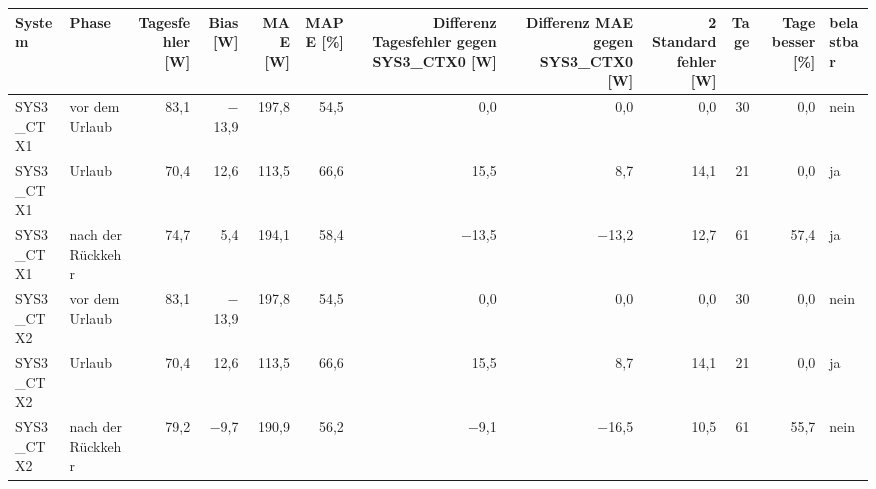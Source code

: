 \begin{tabular}{llrrrrrrrrrl}
\toprule
System & Phase & Tagesfehler [W] & Bias [W] & MAE [W] & MAPE [\%] & Differenz Tagesfehler gegen SYS3\_CTX0 [W] & Differenz MAE gegen SYS3\_CTX0 [W] & 2 Standardfehler [W] & Tage & Tage besser [\%] & belastbar \\
\midrule
SYS3\_CTX1 & vor dem Urlaub & 83,1 & $-$13,9 & 197,8 & 54,5 & 0,0 & 0,0 & 0,0 & 30 & 0,0 & nein \\
SYS3\_CTX1 & Urlaub & 70,4 & 12,6 & 113,5 & 66,6 & 15,5 & 8,7 & 14,1 & 21 & 0,0 & ja \\
SYS3\_CTX1 & nach der Rückkehr & 74,7 & 5,4 & 194,1 & 58,4 & $-$13,5 & $-$13,2 & 12,7 & 61 & 57,4 & ja \\
SYS3\_CTX2 & vor dem Urlaub & 83,1 & $-$13,9 & 197,8 & 54,5 & 0,0 & 0,0 & 0,0 & 30 & 0,0 & nein \\
SYS3\_CTX2 & Urlaub & 70,4 & 12,6 & 113,5 & 66,6 & 15,5 & 8,7 & 14,1 & 21 & 0,0 & ja \\
SYS3\_CTX2 & nach der Rückkehr & 79,2 & $-$9,7 & 190,9 & 56,2 & $-$9,1 & $-$16,5 & 10,5 & 61 & 55,7 & nein \\
\bottomrule
\end{tabular}
